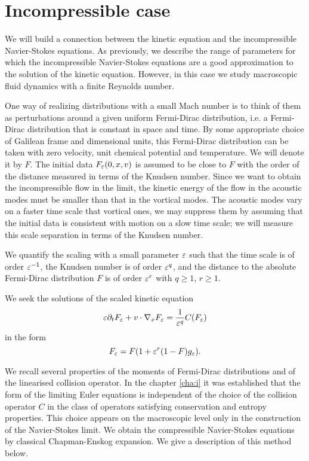 \section{Incompressible case}
  \label{section:INSE}
We will build a connection between the kinetic equation and the incompressible Navier-Stokes equations. As previously, we describe the range of parameters for which the incompressible Navier-Stokes equations are a good approximation to the solution of the kinetic equation. However, in this case we study macroscopic fluid dynamics with a finite Reynolds number.

One way of realizing distributions with a small Mach number is to think of 
them as perturbations around a given uniform Fermi-Dirac distribution, i.e. a Fermi-Dirac distribution that  is
constant in space and time. By some appropriate choice of Galilean frame and
dimensional units, this Fermi-Dirac distribution can be taken with zero
velocity, unit chemical potential and temperature. We will denote
it by $F$. The initial data $F_{\varepsilon}(0,x,v)$ is assumed to be close to $F$
with the order of the distance measured in terms of the Knudsen number. Since we want to obtain the
incompressible flow in the limit, the kinetic energy of the flow in the acoustic modes must be
smaller than that in the vortical modes. The acoustic modes vary on a faster
time scale that vortical ones, we may suppress them by assuming that the
initial data is consistent with motion on a slow time scale; we will measure
this scale separation in terms of the Knudsen number.

We quantify the scaling with a small parameter ${\varepsilon}$ such that the time scale is
of order ${\varepsilon}^{-1}$, the Knudsen number is of order ${\varepsilon}^q$, and
the distance to the absolute Fermi-Dirac distribution $F$ is of order
${\varepsilon}^r$ with $q\ge 1$, $r\ge 1$.

We seek the solutions of the scaled kinetic equation  
\begin{equation}{\varepsilon}\partial_t F_{\varepsilon}+ v\cdot\nabla_x F_{\varepsilon} =
\frac{1}{{\varepsilon}^q}C(F_{\varepsilon})\label{eq:inc}\end{equation}
in the form
\begin{equation}F_{\varepsilon} = F(1+{\varepsilon}^r(1-F)g_{\varepsilon}).\label{eq:incsol}
\end{equation}

We recall several properties of the moments of Fermi-Dirac distributions and of the linearised collision operator. In the chapter \ref{cha:i} it was established that the form of the limiting Euler equations is 
independent of the choice of the collision operator $C$ in the class of 
operators satisfying conservation and entropy properties. This choice appears on 
the macroscopic level only in the construction of the Navier-Stokes limit. We 
obtain the compressible Navier-Stokes equations by classical Chapman-Enskog 
expansion. We give a description of this method below.

